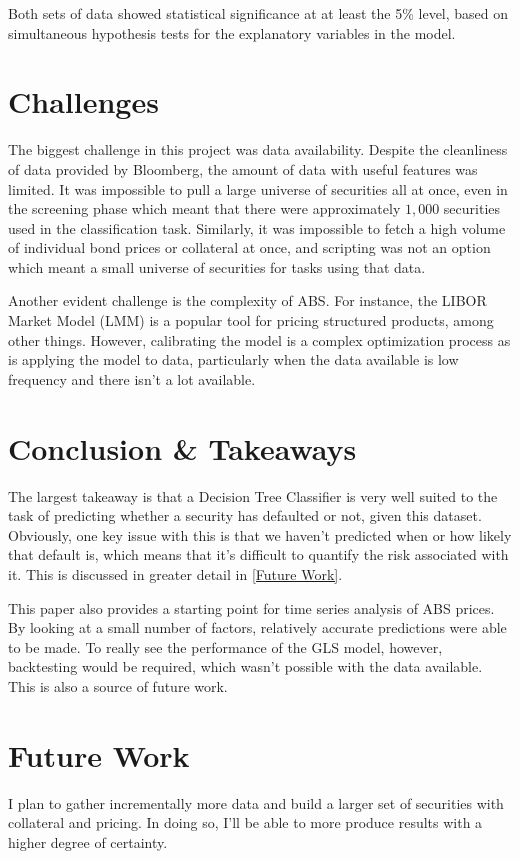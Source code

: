 \documentclass{article}
\begin{document}
Both sets of data showed statistical significance at at least the 5\% level, based on simultaneous hypothesis tests for the explanatory variables in the model. 

\section*{Challenges}
The biggest challenge in this project was data availability. Despite the cleanliness of data provided by Bloomberg, the amount of data with useful features was limited. It was impossible to pull a large universe of securities all at once, even in the screening phase which meant that there were approximately $1,000$ securities used in the classification task. Similarly, it was impossible to fetch a high volume of individual bond prices or collateral at once, and scripting was not an option which meant a small universe of securities for tasks using that data.

Another evident challenge is the complexity of ABS. For instance, the LIBOR Market Model (LMM) is a popular tool for pricing structured products, among other things. However, calibrating the model is a complex optimization process as is applying the model to data, particularly when the data available is low frequency and there isn't a lot available. 


 


\section*{Conclusion \& Takeaways}
The largest takeaway is that a Decision Tree Classifier is very well suited to the task of predicting whether a security has defaulted or not, given this dataset. Obviously, one key issue with this is that we haven't predicted when or how likely that default is, which means that it's difficult to quantify the risk associated with it. This is discussed in greater detail in \ref{Future Work}. 

This paper also provides a starting point for time series analysis of ABS prices. By looking at a small number of factors, relatively accurate predictions were able to be made. To really see the performance of the GLS model, however, backtesting would be required, which wasn't possible with the data available. This is also a source of future work. 

\section*{Future Work}
\label{Future Work}
I plan to gather incrementally more data and build a larger set of securities with collateral and pricing. In doing so, I'll be able to more produce results with a higher degree of certainty.
\end{document}
